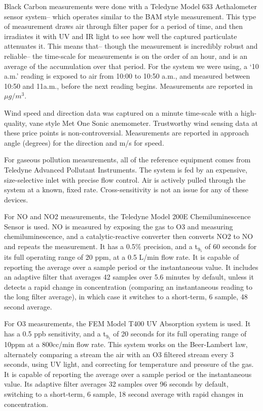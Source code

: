 Black Carbon measurements were done with a Teledyne Model 633 Aethalometer sensor system-- which operates similar to the BAM style measurement.  This type of measurement draws air through filter paper for a period of time, and then irradiates it with UV and IR light to see how well the captured particulate attenuates it.  This means that-- though the measurement is incredibly robust and reliable-- the time-scale for measurements is on the order of an hour, and is an average of the accumulation over that period.  For the system we were using, a `10 a.m.' reading is exposed to air from 10:00 to 10:50 a.m., and measured between 10:50 and 11a.m., before the next reading begins.  Measurements are reported in \(\mu g/m^3\).
   
Wind speed and direction data was captured on a minute time-scale with a high-quality, vane style Met One Sonic anemometer.  Trustworthy wind sensing data at these price points is non-controversial.  Measurements are reported in approach angle (degrees) for the direction and m/s for speed.
   
For gaseous pollution measurements, all of the reference equipment comes from Teledyne Advanced Pollutant Instruments.  The system is fed by an expensive, size-selective inlet with precise flow control.  Air is actively pulled through the system at a known, fixed rate.   Cross-sensitivity is not an issue for any of these devices.  

For NO and NO2 measurements, the Teledyne Model 200E Chemiluminescence Sensor is used. NO is measured by exposing the gas to O3 and measuring chemiluminescence, and a catalytic-reactive converter then converts NO2 to NO and repeats the measurement.  It has a 0.5\% precision, and a t$_9_5$ of 60 seconds for its full operating range of 20 ppm, at a 0.5 L/min flow rate.  It is capable of reporting the average over a sample period or the instantaneous value.  It includes an adaptive filter that averages 42 samples over 5.6 minutes by default, unless it detects a rapid change in concentration (comparing an instantaneous reading to the long filter average), in which case it switches to a short-term, 6 sample, 48 second average.     

For O3 measurements, the FEM Model T400 UV Absorption system is used.  It has a 0.5 ppb sensitivity, and a t$_9_5$ of 20 seconds for its full operating range of 10ppm at a 800cc/min flow rate.  This system works on the Beer-Lambert law, alternately comparing a stream the air with an O3 filtered stream every 3 seconds, using UV light, and correcting for temperature and pressure of the gas.  It is capable of reporting the average over a sample period or the instantaneous value. Its adaptive filter averages 32 samples over 96 seconds by default, switching to a short-term, 6 sample, 18 second average with rapid changes in concentration.

